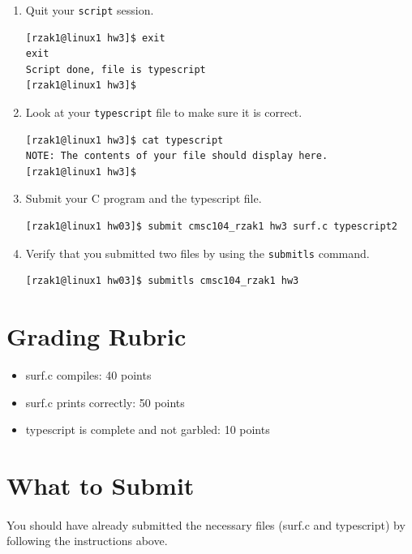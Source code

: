 \documentclass[letter,11pt]{article}
\begin{document}
\begin{enumerate}
\begin{verbatim}
[rzak1@linux1 hw3]$ ./a.out
    \end{verbatim}
    \item Quit your \texttt{script} session.
    \begin{verbatim}
[rzak1@linux1 hw3]$ exit
exit
Script done, file is typescript
[rzak1@linux1 hw3]$
    \end{verbatim}
    \item Look at your \texttt{typescript} file to make sure it is correct.
    \begin{verbatim}
[rzak1@linux1 hw3]$ cat typescript
NOTE: The contents of your file should display here.
[rzak1@linux1 hw3]$ 
    \end{verbatim}
    \item Submit your C program and the typescript file.
    \begin{verbatim}
[rzak1@linux1 hw03]$ submit cmsc104_rzak1 hw3 surf.c typescript2
    \end{verbatim}
    \item Verify that you submitted two files by using the \texttt{submitls} command.
    \begin{verbatim}
[rzak1@linux1 hw03]$ submitls cmsc104_rzak1 hw3
    \end{verbatim}
\end{enumerate}

\section*{Grading Rubric}
\begin{itemize}
    \item surf.c compiles: 40 points
    \item surf.c prints correctly: 50 points
    \item typescript is complete and not garbled: 10 points
\end{itemize}

\section*{What to Submit}
\paragraph{}You should have already submitted the necessary files (surf.c and typescript) by following the instructions above.
\end{document}
